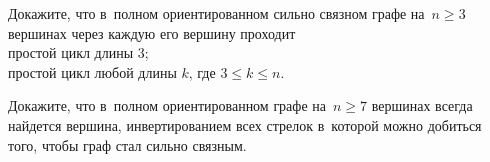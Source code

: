 






\begin{problems}

\item
Докажите, что в~полном ориентированном сильно связном графе на~$n \geq 3$
вершинах через каждую его вершину проходит
\\
\subproblem простой цикл длины $3$;
\\
\subproblem простой цикл любой длины $k$, где $3 \leq k \leq n$.

\item
Докажите, что в~полном ориентированном графе на~$n \geq 7$ вершинах всегда
найдется вершина, инвертированием всех стрелок в~которой можно добиться того,
чтобы граф стал сильно связным.

\end{problems}


